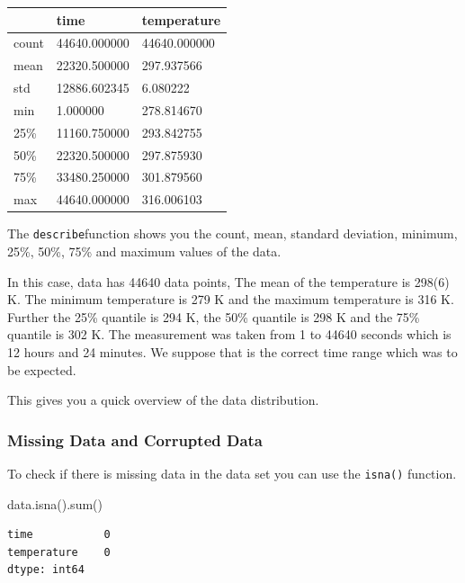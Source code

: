 \documentclass[
  letterpaper,
  DIV=11,
  numbers=noendperiod]{scrreprt}
\newenvironment{Shaded}{\begin{snugshade}}{\end{snugshade}}
\newcommand{\BuiltInTok}[1]{\textcolor[rgb]{0.00,0.23,0.31}{#1}}
\newcommand{\NormalTok}[1]{\textcolor[rgb]{0.00,0.23,0.31}{#1}}
\begin{document}
\begin{longtable}[]{@{}lll@{}}
\toprule\noalign{}
& time & temperature \\
\midrule\noalign{}
\endhead
\bottomrule\noalign{}
\endlastfoot
count & 44640.000000 & 44640.000000 \\
mean & 22320.500000 & 297.937566 \\
std & 12886.602345 & 6.080222 \\
min & 1.000000 & 278.814670 \\
25\% & 11160.750000 & 293.842755 \\
50\% & 22320.500000 & 297.875930 \\
75\% & 33480.250000 & 301.879560 \\
max & 44640.000000 & 316.006103 \\
\end{longtable}

The \texttt{describe}function shows you the count, mean, standard
deviation, minimum, 25\%, 50\%, 75\% and maximum values of the data.

In this case, data has 44640 data points, The mean of the temperature is
298(6) K. The minimum temperature is 279 K and the maximum temperature
is 316 K. Further the 25\% quantile is 294 K, the 50\% quantile is 298 K
and the 75\% quantile is 302 K. The measurement was taken from 1 to
44640 seconds which is 12 hours and 24 minutes. We suppose that is the
correct time range which was to be expected.

This gives you a quick overview of the data distribution.

\subsubsection*{Missing Data and Corrupted
Data}\label{missing-data-and-corrupted-data-1}

To check if there is missing data in the data set you can use the
\texttt{isna()} function.

\begin{Shaded}
\begin{Highlighting}[]
\NormalTok{data.isna().}\BuiltInTok{sum}\NormalTok{()}
\end{Highlighting}
\end{Shaded}

\begin{verbatim}
time           0
temperature    0
dtype: int64
\end{verbatim}
\end{document}
